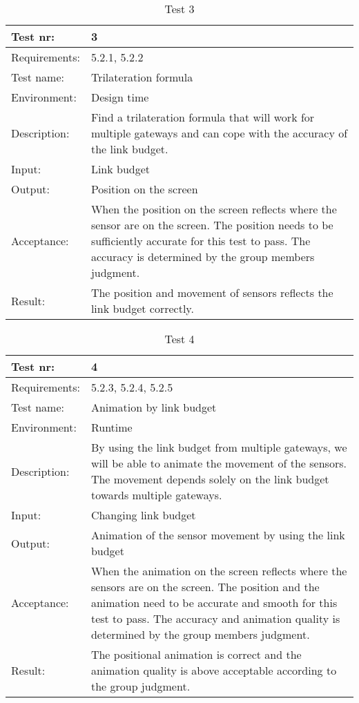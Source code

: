 \documentclass[../document]{subfiles}
\begin{document}
\begin{table}[H]
\caption{Test 3}
\centering
\begin{tabularx}{\textwidth}{|l|X|}
\hline	
Test nr:
&3
\\ \hline Requirements:
&5.2.1, 5.2.2
\\ \hline Test name:
&Trilateration formula
\\ \hline Environment:
&Design time
\\ \hline Description:
&Find a trilateration formula that will work for multiple gateways and can cope with the accuracy of the link budget.
\\ \hline Input:
&Link budget
\\ \hline Output:
&Position on the screen
\\ \hline Acceptance:
&When the position on the screen reflects where the sensor are on the screen. The position needs to be sufficiently accurate for this test to pass. The accuracy is determined by the group members judgment.
\\ \hline Result:
&The position and movement of sensors reflects the link budget correctly.
\\ \hline 
\end{tabularx}
\end{table}

\begin{table}[H]
\caption{Test 4}
\centering
\begin{tabularx}{\textwidth}{|l|X|}
\hline
Test nr:
&4
\\ \hline Requirements:
&5.2.3, 5.2.4, 5.2.5
\\ \hline Test name:
&Animation by link budget
\\ \hline Environment:
&Runtime
\\ \hline Description:
&By using the link budget from multiple gateways, we will be able to animate the movement of the sensors. The movement depends solely on the link budget towards multiple gateways.
\\ \hline Input:
&Changing link budget
\\ \hline Output:
&Animation of the sensor movement by using the link budget
\\ \hline Acceptance:
&When the animation on the screen reflects where the sensors are on the screen. The position and the animation need to be accurate and smooth for this test to pass. The accuracy and animation quality is determined by the group members judgment.
\\ \hline Result:
&The positional animation is correct and the animation quality is above acceptable according to the group judgment.
\\ \hline 
\end{tabularx}
\end{table}
\end{document}
